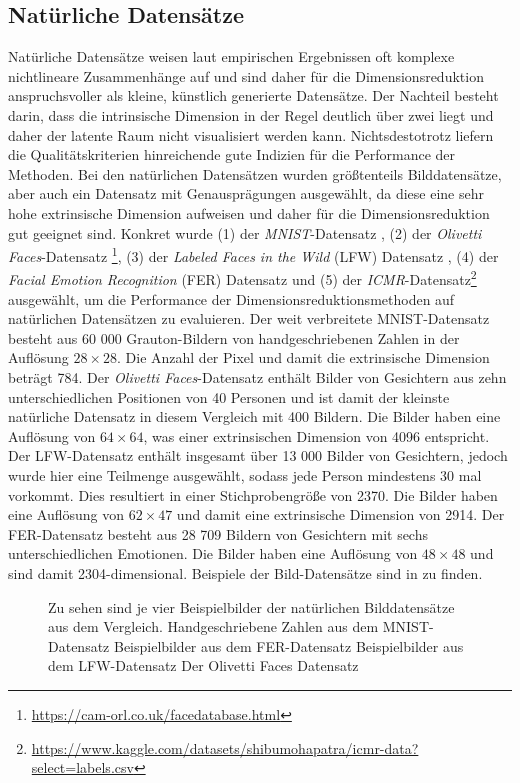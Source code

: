 \subsection{Natürliche Datensätze}
\label{ch:Vergleich:sec:VerwendeteDatensaetze:natuerlich}
Natürliche
Datensätze weisen laut empirischen Ergebnissen \addref oft komplexe nichtlineare Zusammenhänge
auf und sind daher für die Dimensionsreduktion anspruchsvoller als kleine, künstlich generierte
Datensätze. Der Nachteil besteht darin, dass die intrinsische Dimension in der Regel deutlich über
zwei liegt und daher der latente Raum nicht visualisiert werden kann. Nichtsdestotrotz liefern die
Qualitätskriterien hinreichende gute Indizien für die Performance der Methoden. Bei den natürlichen
Datensätzen wurden größtenteils Bilddatensätze, aber auch ein Datensatz mit Genausprägungen ausgewählt, da diese eine
sehr hohe extrinsische Dimension aufweisen und daher für die Dimensionsreduktion gut geeignet sind.
Konkret wurde (1) der \textit{MNIST}-Datensatz \parencite{LeCun.2010}, (2) der \textit{Olivetti Faces}-Datensatz
\footnote{\url{https://cam-orl.co.uk/facedatabase.html}}, (3) der \textit{Labeled Faces in the
	Wild} (LFW) Datensatz \parencite{GaryB.Huang.2007}, (4) der \textit{Facial Emotion Recognition} (FER) Datensatz \parencite{DumitruIanGoodfellowWillCukierskiYoshuaBengio.2013} und (5) der
\textit{ICMR}-Datensatz\footnote{\url{https://www.kaggle.com/datasets/shibumohapatra/icmr-data?select=labels.csv}}
ausgewählt, um die Performance der Dimensionsreduktionsmethoden auf natürlichen Datensätzen zu
evaluieren. Der weit verbreitete MNIST-Datensatz besteht aus 60 000 Grauton-Bildern von
handgeschriebenen Zahlen in der Auflösung $28 \times 28$. Die Anzahl der Pixel und damit die
extrinsische Dimension beträgt 784. Der \textit{Olivetti Faces}-Datensatz enthält Bilder von
Gesichtern aus zehn unterschiedlichen Positionen von 40 Personen und ist damit der kleinste
natürliche Datensatz in diesem Vergleich mit 400 Bildern. Die Bilder haben eine Auflösung von $64
	\times 64$, was einer extrinsischen Dimension von 4096 entspricht. Der LFW-Datensatz enthält
insgesamt über 13 000 Bilder von Gesichtern, jedoch wurde hier eine Teilmenge ausgewählt, sodass
jede Person mindestens 30 mal vorkommt. Dies resultiert in einer Stichprobengröße von 2370. Die
Bilder haben eine Auflösung von $62 \times 47$ und damit eine extrinsische Dimension von 2914. Der
FER-Datensatz besteht aus 28 709 Bildern von Gesichtern mit sechs unterschiedlichen Emotionen. Die
Bilder haben eine Auflösung von $48 \times 48$ und sind damit 2304-dimensional. Beispiele der
Bild-Datensätze sind in  zu finden.
\begin{figure}
	\begin{center}
		
	\end{center}
	\caption[Beispielbilder der natürlichen Datensätze]{Zu sehen sind je vier Beispielbilder der natürlichen Bilddatensätze aus dem Vergleich. \captiona Handgeschriebene Zahlen aus dem MNIST-Datensatz \captionb Beispielbilder aus dem FER-Datensatz \captionc Beispielbilder aus dem LFW-Datensatz \captiond Der Olivetti Faces Datensatz }
	\label{fig:Dataset_samples}
\end{figure}

